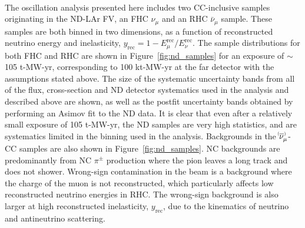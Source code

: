\begin{figure*}
  \centering
  \\
  \caption{ND samples in both FHC and RHC, shown in the reconstructed neutrino energy and reconstructed inelasticity binning ($y_{\mathrm{rec}}$) used in the analysis, for a $\sim$105 t-MW-yr exposure (equivalent to a 100 kt-MW-yr exposure at the FD), with an equal split between FHC and RHC. The size of the systematic uncertainty bands from all of the flux, cross-section and ND detector systematics used in the analysis are shown, as well as the postfit uncertainty bands obtained by performing an Asimov fit to the ND data. NC backgrounds and wrong-sign contributions to the total event rate are also shown. Note that statistical uncertainties are too small to be visible on this plot scale.}
 \label{fig:nd_samples}
\end{figure*}
The oscillation analysis presented here includes two CC-inclusive samples originating in the ND-LAr FV, an FHC $\nu_{\mu}$ and an RHC $\bar{\nu}_{\mu}$ sample. These samples are both binned in two dimensions, as a function of reconstructed neutrino energy and inelasticity, $y_{\mathrm{rec}} = 1 - E^{\mathrm{rec}}_{\mu}/E^{\mathrm{rec}}_{\nu}$. The sample distributions for both FHC and RHC are shown in Figure~\ref{fig:nd_samples} for an exposure of $\sim$105 t-MW-yr, corresponding to 100 kt-MW-yr at the far detector with the assumptions stated above. The size of the systematic uncertainty bands from all of the flux, cross-section and ND detector systematics used in the analysis and described above are shown, as well as the postfit uncertainty bands obtained by performing an Asimov fit to the ND data. It is clear that even after a relatively small exposure of 105 t-MW-yr, the ND samples are very high statistics, and are systematics limited in the binning used in the analysis. Backgrounds in the $\nu^{\bracketbar}_{\mu}$-CC samples are also shown in Figure~\ref{fig:nd_samples}. NC backgrounds are predominantly from NC $\pi^{\pm}$ production where the pion leaves a long track and does not shower. Wrong-sign contamination in the beam is a background where the charge of the muon is not reconstructed, which particularly affects low reconstructed neutrino energies in RHC. The wrong-sign background is also larger at high reconstructed inelasticity, $y_{\mathrm{rec}}$, due to the kinematics of neutrino and antineutrino scattering.

